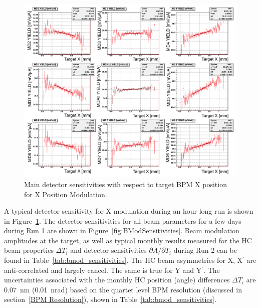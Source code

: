 \begin{singlespace}
\begin{figure}[!h]
	\begin{center}
	\includegraphics[width=15.0cm]{figures/BModDetectorSensitivity}
	\end{center}
	\caption
	{Main detector sensitivities with respect to target BPM X position for X Position Modulation.}
	\label{fig:BModDetectorSensitivity}
\end{figure}
\end{singlespace}

A typical detector sensitivity for X modulation during an hour long run is shown in Figure~\ref{fig:BModDetectorSensitivity}. The detector sensitivities for all beam parameters for a few days during Run 1 are shown in Figure~\ref{fig:BModSensitivities}. 
Beam modulation amplitudes at the target, as well as typical monthly results measured for the HC beam properties $\Delta T_{i}$ and detector sensitivities $\partial A /\partial T_{i}$ during Run 2 can be found in Table~\ref{tab:bmod_sensitivities}. The HC beam asymmetries for X, X$^\prime$ are anti-correlated and largely cancel. The same is true for Y and Y$^\prime$. The uncertainties associated with the monthly HC position (angle) differences $\Delta T_{i}$ are 0.07~nm (0.01~nrad) based on the quartet level BPM resolution (discussed in section~\ref{BPM Resolution}), shown in Table~\ref{tab:bmod_sensitivities}. 

